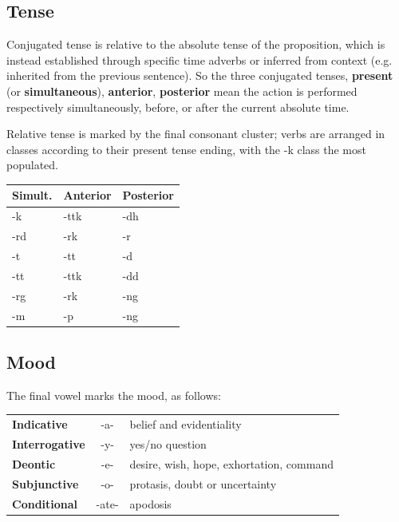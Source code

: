 \documentclass[10pt,oneside]{memoir}
\newcommand\setrow[1]{\gdef\rowmac{#1}#1\ignorespaces}
\newcommand\clearrow{\global\let\rowmac\relax}
\begin{document}
\begin{multicols}{2}
	\subsection{Tense}
    Conjugated tense is relative to the absolute tense of the proposition, which is instead established through specific time adverbs or inferred from context (e.g. inherited from the previous sentence). So the three conjugated tenses, \textbf{present} (or \textbf{simultaneous}), \textbf{anterior}, \textbf{posterior} mean the action is performed respectively simultaneously, before, or after the current absolute time.

	Relative tense is marked by the final consonant cluster; verbs are arranged in classes according to their present tense ending, with the -k class the most populated.

	\vspace{10pt}

	\begin{tabularx}{\columnwidth}{>{\rowmac}Y>{\rowmac}Y>{\rowmac}Y<{\clearrow}}
		\setrow{\bfseries}Simult. & Anterior &Posterior \\
		\hline
		-k & -ttk & -dh \\
		-rd & -rk & -r \\
		-t & -tt & -d \\
		-tt & -ttk & -dd \\
		-rg & -rk & -ng \\
		-m & -p & -ng
	\end{tabularx}

	\subsection{Mood}

	The final vowel marks the mood, as follows:

	\begin{tabularx}{\columnwidth}{l | c | >{\small}X<{\normalsize}}
		\textbf{Indicative} & -a- & belief and evidentiality\\
		\textbf{Interrogative} & -y- & yes/no question\\
		\textbf{Deontic} & -e- & desire, wish, hope, exhortation, command\\
		\textbf{Subjunctive} & -o- & protasis, doubt or uncertainty\\
		\textbf{Conditional} & -ate- & apodosis\\
	\end{tabularx}


\end{multicols}
\end{document}
